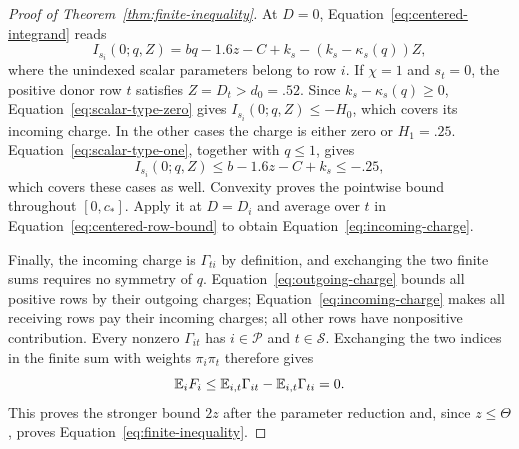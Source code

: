 \begin{proof}[Proof of Theorem~\ref{thm:finite-inequality}]
At $D=0$, Equation~\eqref{eq:centered-integrand} reads
\[
 I_{s_i}(0;q,Z)
 =bq-1.6z-C+k_s-(k_s-\kappa_s(q))Z,
\]
where the unindexed scalar parameters belong to row $i$.
If $\chi=1$ and $s_t=0$, the positive donor row $t$ satisfies
$Z=D_t>d_0=.52$.  Since $k_s-\kappa_s(q)\ge0$,
Equation~\eqref{eq:scalar-type-zero} gives
$I_{s_i}(0;q,Z)\le-H_0$, which covers its incoming charge.
In the other cases the charge is either zero or $H_1=.25$.
Equation~\eqref{eq:scalar-type-one}, together with $q\le1$,
gives
\[
 I_{s_i}(0;q,Z)\le b-1.6z-C+k_s\le-.25,
\]
which covers these cases as well.  Convexity proves the pointwise
bound throughout $[0,c_*]$.  Apply it at $D=D_i$ and average over
$t$ in Equation~\eqref{eq:centered-row-bound} to obtain
Equation~\eqref{eq:incoming-charge}.

Finally, the incoming charge is $\Gamma_{ti}$ by definition, and
exchanging the two finite sums requires no symmetry of $q$.
Equation~\eqref{eq:outgoing-charge} bounds all
positive rows by their outgoing charges;
Equation~\eqref{eq:incoming-charge} makes all receiving rows pay
their incoming charges; all other rows have nonpositive contribution.
Every nonzero $\Gamma_{it}$ has $i\in\mathcal P$ and
$t\in\mathcal S$.  Exchanging the two indices in the finite sum with
weights $\pi_i\pi_t$ therefore gives
\[
 \mathbb E_iF_i\le\mathbb E_{i,t}\Gamma_{it}-\mathbb E_{i,t}\Gamma_{ti}=0.
\]
This proves the stronger bound $2z$ after the parameter reduction and,
since $z\le\Theta$, proves Equation~\eqref{eq:finite-inequality}.
\end{proof}
